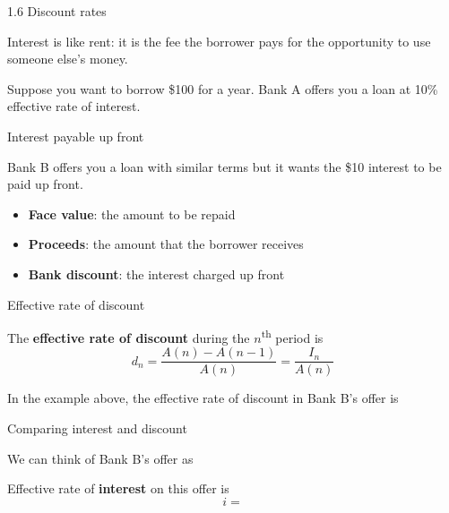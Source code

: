 \documentclass{beamer}
\begin{document}
\begin{frame}{1.6 Discount rates}

Interest is like rent: it is the fee the borrower pays for the opportunity to use someone else's money.

\bigskip
Suppose you want to borrow \$100 for a year. Bank A offers you a loan at 10\% effective rate of interest.

\begin{center}
\end{center}

\end{frame}

\begin{frame}{Interest payable up front}

Bank B offers you a loan with similar terms but it wants the \$10 interest to be paid up front.

\begin{center}
\end{center}

\begin{itemize}
\item \textbf{Face value}: the amount to be repaid
\item \textbf{Proceeds}: the amount that the borrower receives
\item \textbf{Bank discount}: the interest charged up front
\end{itemize}

\end{frame}

\begin{frame}{Effective rate of discount}

\begin{defn}
The \textbf{effective rate of discount} during the $n$\textsuperscript{th} period is
\[
d_n = \frac{A(n) - A(n-1)}{A(n)} = \frac{I_n}{A(n)}
\]
\end{defn}

In the example above, the effective rate of discount in Bank B's offer is

\vfill
\end{frame}

\begin{frame}{Comparing interest and discount}

We can think of Bank B's offer as

\begin{center}
\end{center}

Effective rate of \textbf{interest} on this offer is
\[
i =
\]

\vfill
\end{frame}
\end{document}
